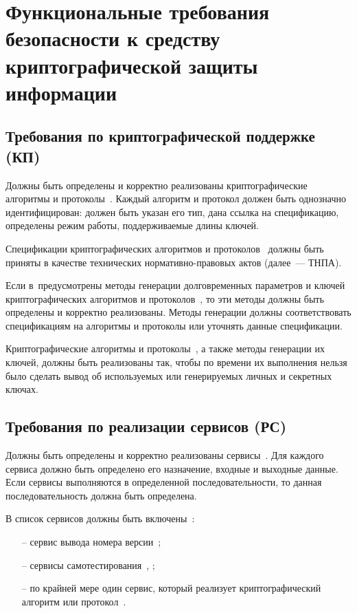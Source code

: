\chapter{Функциональные требования безопасности к средству 
криптографической защиты информации}\label{FReqsTOE}

\section{Требования по криптографической поддержке (КП)}

\label{CryptoAlg}
Должны быть определены и корректно реализованы криптографические алгоритмы 
и протоколы~\TOE. 
%
Каждый алгоритм и протокол должен быть однозначно идентифицирован:
должен быть указан его тип, 
дана ссылка на спецификацию, 
определены режим работы, 
поддерживаемые длины ключей.

\label{CryptoStd}
Спецификации криптографических алгоритмов и протоколов~
должны быть приняты в качестве технических нормативно-правовых актов 
(далее~--- ТНПА).

\label{CryptoGen}
Если в~\TOE предусмотрены методы генерации долговременных параметров и ключей
криптографических алгоритмов и протоколов~, 
то эти методы должны быть определены и корректно реализованы.
%
Методы генерации должны соответствовать спецификациям
на алгоритмы и протоколы или уточнять данные спецификации.

\label{CryptoTiming}
Криптографические алгоритмы и протоколы~,
а также методы генерации их ключей,
должны быть реализованы так,
чтобы по времени их выполнения нельзя было сделать вывод об
используемых или генерируемых личных и секретных ключах.

\section{Требования по реализации сервисов (РС)}

\label{Services}
Должны быть определены и корректно реализованы сервисы~\TOE.
%
Для каждого сервиса должно быть определено его назначение, 
входные и выходные данные. 
%
Если сервисы выполняются в определенной последовательности,
то данная последовательность должна быть определена.

\label{ObligServices}
В список сервисов должны быть включены~:
\begin{itemize}
\item[--]
сервис вывода номера версии~\TOE;
\item[--]
сервисы самотестирования~, ;
\item[--]
по крайней мере один сервис,
который реализует криптографический алгоритм или протокол~.
\end{itemize}

